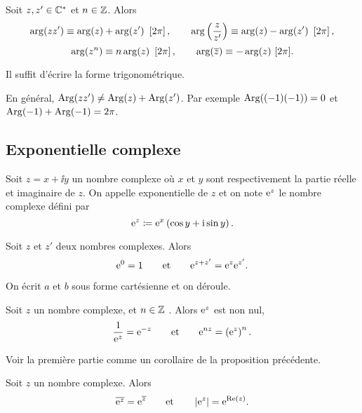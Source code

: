 \documentclass{magnolia}
\begin{document}
\begin{proposition}[utile=-3]
  Soit $z,z'\in\mathbb{C}^*$ et $n\in\mathbb{Z}$. Alors
  \[\arg(z z')\equiv\arg(z)+\arg(z')\ \left[2\pi\right], \qquad
    \arg\left(\frac{z}{z'}\right)\equiv\arg(z)-\arg(z')\ \left[2\pi\right],\]
  \[\arg(z^n)\equiv n\arg(z)\ \left[2\pi\right], \qquad
    \arg(\overline{z})\equiv -\arg(z)\ [2\pi].\]
\end{proposition}

\begin{preuve}
Il suffit d'écrire la forme trigonométrique.
\end{preuve}

\begin{remarqueUnique}
\remarque En général,
  $\operatorname{Arg}(z z')\neq\operatorname{Arg}(z)+\operatorname{Arg}(z')$. Par exemple $\operatorname{Arg}((-1)(-1))=0$ et $\operatorname{Arg}(-1)+\operatorname{Arg}(-1)=2\pi$.
\end{remarqueUnique}

\subsection{Exponentielle complexe}

\begin{definition}[utile=-3]
Soit $z=x+\ii y$ un nombre complexe où $x$ et $y$ sont respectivement la partie
réelle et imaginaire de $z$. On appelle exponentielle de $z$ et on note ${\rm e}^z$
le nombre complexe défini par
\[{\rm e}^z\coloneqq{\rm e}^{x}\left(\cos y +{\rm i} \sin y\right).\]
\end{definition}

\begin{proposition}[utile=-3]
Soit $z$ et $z'$ deux nombres complexes. Alors
\[{\rm e}^{0}=1 \qquad \text{et} \qquad {\rm e}^{z+z'}={\rm e}^{z} {\rm e}^{z'}.\]
\end{proposition}

\begin{preuve}
On écrit $a$ et $b$ sous forme cartésienne et on déroule.
\end{preuve}

\begin{proposition}[utile=-3]
Soit $z$ un nombre complexe, et $n\in\mathbb{Z}$ . Alors ${\rm e}^z$ est non nul,
\[\frac{1}{{\rm e}^z}={\rm e}^{-z} \qquad \text{et} \qquad {\rm e}^{nz}=\left({\rm e}^z\right)^n.\]
\end{proposition}

\begin{preuve}
Voir la première partie comme un corollaire de la proposition précédente. 
\end{preuve}

\begin{proposition}[utile=-3]
Soit $z$ un nombre complexe. Alors
\[\overline{{\rm e}^z}={\rm e}^{\overline{z}} \qquad \text{et} \qquad \left|{\rm e}^z\right|={\rm e}^{\mathop{\rm Re}(z)}.\]
\end{proposition}
\end{document}
